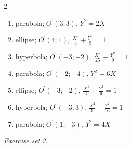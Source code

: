\begin{multicols}{2}
\begin{enumerate}[label=\arabic*., leftmargin=*, itemsep=1pt]
\item parabola; $O^{\prime}(3;3)$, $Y^2=2X$
\item ellipse; $O^{\prime}(4;1)$, $\frac{X^2}{4}+\frac{Y^2}{9}=1$
\item hyperbola; $O^{\prime}(-3;-2)$, $\frac{X^2}{25}-\frac{Y^2}{9}=1$
\item parabola; $O^{\prime}(-2;-4)$, $Y^2=6X$
\item ellipse; $O^{\prime}(-3;-2)$, $\frac{X^2}{4}+\frac{Y^2}{9}=1$
\item hyperbola; $O^{\prime}(-3;3)$, $\frac{X^2}{9}-\frac{Y^2}{16}=1$
\item parabola; $O^{\prime}(1;-3)$, $Y^2=4X$
\end{enumerate}
\end{multicols}
\par\noindent\emph{Exercise set 2.}\nopagebreak
